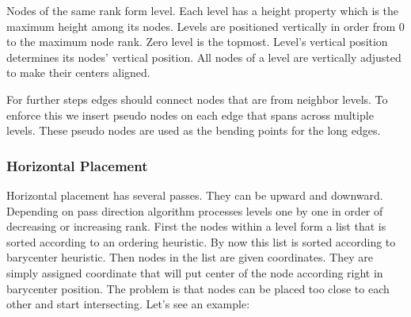 \documentclass[11pt,twoside,a4paper]{article}
\begin{document}
Nodes of the same rank form level. Each level has a height property which is the maximum height among its nodes. Levels are positioned vertically in order from 0 to the maximum node rank. Zero level is the topmost. Level's vertical position determines its nodes' vertical position. All nodes of a level are vertically adjusted to make their centers aligned.

For further steps edges should connect nodes that are from neighbor levels. To enforce this we insert pseudo nodes on each edge that spans across multiple levels. These pseudo nodes are used as the bending points for the long edges.

\subsubsection{Horizontal Placement}
Horizontal placement has several passes. They can be upward and downward. Depending on pass direction algorithm processes levels one by one in order of decreasing or increasing rank. First the nodes within a level form a list that is sorted according to an ordering heuristic. By now this list is sorted according to barycenter heuristic. Then nodes in the list are given coordinates. They are simply assigned coordinate that will put center of the node according right in barycenter position. The problem is that nodes can be placed too close to each other and start intersecting. Let's see an example:\\
\end{document}
